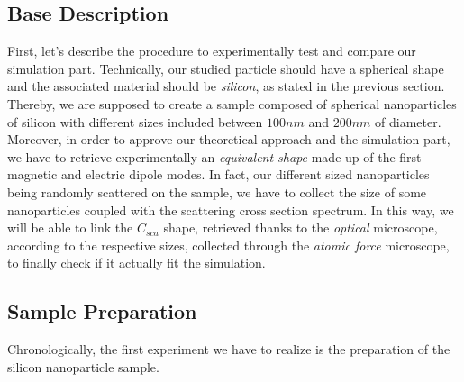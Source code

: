 \documentclass{article}
\numberwithin{equation}{section}
\begin{document}
\subsection{Base Description}

First, let's describe the procedure to experimentally test and compare our simulation part. Technically, our studied particle should have a spherical shape and the associated material should be \textit{silicon}, as stated in the previous section. Thereby, we are supposed to create a sample composed of spherical nanoparticles of silicon with different sizes included between $100nm$ and $200nm$ of diameter. Moreover, in order to approve our theoretical approach and the simulation part, we have to retrieve experimentally an \textit{equivalent shape} made up of the first magnetic and electric dipole modes. In fact, our different sized nanoparticles being randomly scattered on the sample, we have to collect the size of some nanoparticles coupled with the scattering cross section spectrum. In this way, we will be able to link the $C_{sca}$ shape, retrieved thanks to the \textit{optical} microscope, according to the respective sizes, collected through the \textit{atomic force} microscope, to finally check if it actually fit the simulation.

\subsection{Sample Preparation}

Chronologically, the first experiment we have to realize is the preparation of the silicon nanoparticle sample.
\end{document}
